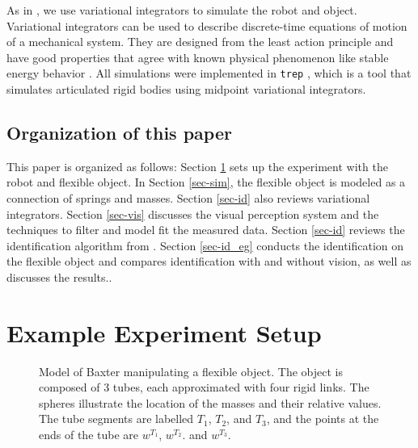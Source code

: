 \documentclass[runningheads,a4paper]{llncs}
\begin{document}
As in \cite{caldwell_coleman_correll_iros}, we use variational integrators to simulate the robot and object.  Variational integrators can be used to describe discrete-time equations of motion of a mechanical system.  They are designed from the least action principle and have good properties that agree with known physical phenomenon like stable energy behavior \cite{pekarek_murphey}. All simulations were implemented in \texttt{trep} \cite{johnson_murphey_scalable,johnson_murphey_linearization}, which is a tool that simulates articulated rigid bodies using midpoint variational integrators.


\subsection{Organization of this paper}
This paper is organized as follows: Section \ref{sec-exp} sets up the experiment with the robot and flexible object. In Section \ref{sec-sim}, the flexible object is modeled as a connection of springs and masses. Section \ref{sec-id} also reviews variational integrators. Section \ref{sec-vis} discusses the visual perception system and the techniques to filter and model fit the measured data. Section \ref{sec-id} reviews the identification algorithm from \cite{caldwell_coleman_correll_iros}. Section \ref{sec-id_eg} conducts the identification on the flexible object and compares identification with and without vision, as well as discusses the results..%

\section{Example Experiment Setup}
\label{sec-exp}
\begin{figure}[!htb]
\centering
\def\svgwidth{.6\textwidth}%

\caption{Model of Baxter manipulating a flexible object. The object is composed of 3 tubes, each approximated with four rigid links. The spheres illustrate the location of the masses and their relative values. The tube segments are labelled $T_1$, $T_2$, and $T_3$, and the points at the ends of the tube are $w^{T_1}$, $w^{T_2}$. and $w^{T_3}$.}
\label{fig-baxter_y_sim}
\end{figure}
\end{document}
